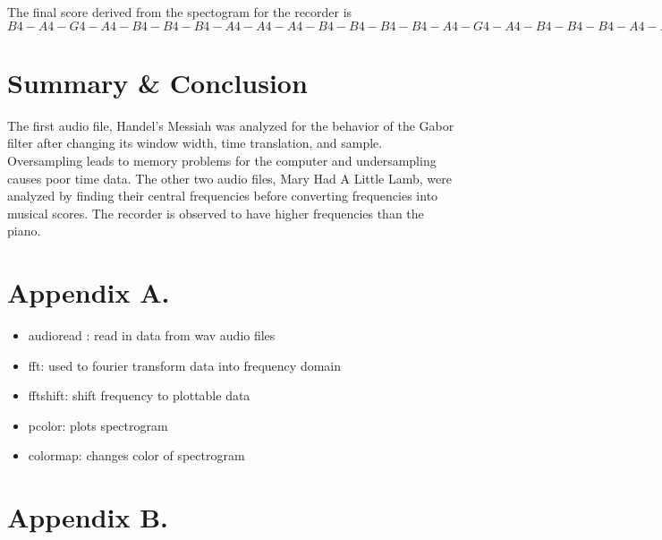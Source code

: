 \documentclass[a4paper,12pt]{article}
\begin{document}
The final score derived from the spectogram for the recorder is \newline
$B4-A4-G4-A4-B4-B4-B4-A4-A4-A4-B4-B4-B4-B4-A4-G4-A4-B4-B4-B4-A4-A4-B4-A4-G4$
\section{Summary \& Conclusion }
The first audio file, Handel's Messiah was analyzed for the behavior of the Gabor filter after changing its window width, time translation, and sample. Oversampling leads to memory problems for the computer and undersampling causes poor time data. 
\newline
\indent The other two audio files, Mary Had A Little Lamb, were analyzed by finding their central frequencies before converting frequencies into musical scores. The recorder is observed to have higher frequencies than the piano.
\section{Appendix A. }
\begin{itemize}
  \item audioread : read in data from wav audio files
  \item fft: used to fourier transform data into frequency domain
  \item fftshift: shift frequency to plottable data
  \item pcolor: plots spectrogram
  \item colormap: changes color of spectrogram
\end{itemize}
\newpage
\section{Appendix B.}

\end{document}
